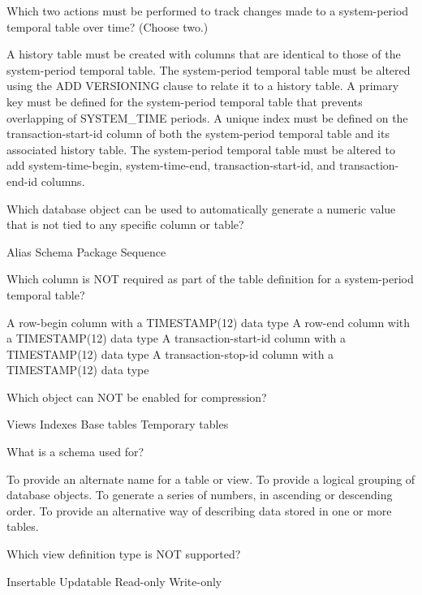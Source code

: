 \documentclass[11pt]{exam}
\begin{document}
\begin{questions}
\newpage
\question[1]
Which two actions must be performed to track changes made to a system-period temporal table over time?
(Choose two.)
\begin{choices}
\choice A history table must be created with columns that are identical to those of the system-period
temporal table.
\choice The system-period temporal table must be altered using the ADD VERSIONING clause to relate it to
a history table.
\choice A primary key must be defined for the system-period temporal table that prevents overlapping
of SYSTEM\_TIME periods.
\choice A unique index must be defined on the transaction-start-id column of both the system-period 
temporal table and its associated history table.
\choice The system-period temporal table must be altered to add system-time-begin, system-time-end, 
transaction-start-id, and transaction-end-id columns.
\end{choices}

\question[1]
Which database object can be used to automatically generate a numeric value that is not tied to any
specific column or table?
\begin{choices}
\choice Alias
\choice Schema
\choice Package
\choice Sequence
\end{choices}

\question[1]
Which column is NOT required as part of the table definition for a system-period temporal table?
\begin{choices}
\choice A row-begin column with a TIMESTAMP(12) data type
\choice A row-end column with a TIMESTAMP(12) data type
\choice A transaction-start-id column with a TIMESTAMP(12) data type
\choice A transaction-stop-id column with a TIMESTAMP(12) data type
\end{choices}

\question[1]
Which object can NOT be enabled for compression?
\begin{choices}
\choice Views
\choice Indexes
\choice Base tables
\choice Temporary tables
\end{choices}

\question[1]
What is a schema used for?
\begin{choices}
\choice To provide an alternate name for a table or view.
\choice To provide a logical grouping of database objects.
\choice To generate a series of numbers, in ascending or descending order.
\choice To provide an alternative way of describing data stored in one or more tables.
\end{choices}

\question[1]
Which view definition type is NOT supported?
\begin{choices}
\choice Insertable
\choice Updatable
\choice Read-only
\choice Write-only
\end{choices}


\end{questions}
\end{document}

